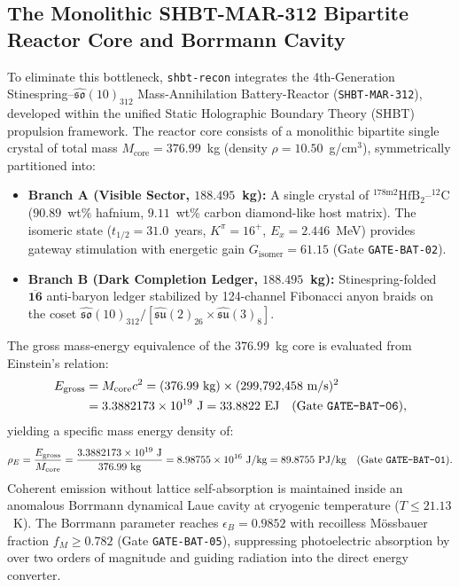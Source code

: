 \documentclass[11pt,onecolumn]{article}
\begin{document}
\FloatBarrier
\subsection{The Monolithic SHBT-MAR-312 Bipartite Reactor Core and Borrmann Cavity}
To eliminate this bottleneck, \texttt{shbt-recon} integrates the 4th-Generation Stinespring--$\widehat{\mathfrak{so}}(10)_{312}$ Mass-Annihilation Battery-Reactor (\texttt{SHBT-MAR-312}), developed within the unified Static Holographic Boundary Theory (SHBT) propulsion framework. The reactor core consists of a monolithic bipartite single crystal of total mass $M_{\text{core}} = 376.99$~kg (density $\rho = 10.50$~g/cm$^3$), symmetrically partitioned into:
\begin{itemize}
    \item \textbf{Branch A (Visible Sector, $188.495$~kg):} A single crystal of $^{178\text{m}2}\text{HfB}_2\text{--}^{12}\text{C}$ ($90.89$~wt\% hafnium, $9.11$~wt\% carbon diamond-like host matrix). The isomeric state ($t_{1/2} = 31.0$~years, $K^\pi = 16^+$, $E_x = 2.446$~MeV) provides gateway stimulation with energetic gain $G_{\text{isomer}} = 61.15$ (Gate \texttt{GATE-BAT-02}).
    \item \textbf{Branch B (Dark Completion Ledger, $188.495$~kg):} Stinespring-folded $\overline{\mathbf{16}}$ anti-baryon ledger stabilized by 124-channel Fibonacci anyon braids on the coset $\widehat{\mathfrak{so}}(10)_{312} / [\widehat{\mathfrak{su}}(2)_{26} \times \widehat{\mathfrak{su}}(3)_8]$.
\end{itemize}
The gross mass-energy equivalence of the $376.99$~kg core is evaluated from Einstein's relation:
\begin{equation}
\begin{split}
E_{\text{gross}} &= M_{\text{core}} c^2 = (376.99~\text{kg})\times (299{,}792{,}458~\text{m/s})^2 \\
&= 3.3882173\times 10^{19}~\text{J} = 33.8822~\text{EJ} \quad (\text{Gate \texttt{GATE-BAT-06}}),
\end{split}
\end{equation}
yielding a specific mass energy density of:
\begin{equation}
\rho_E = \frac{E_{\text{gross}}}{M_{\text{core}}} = \frac{3.3882173\times 10^{19}~\text{J}}{376.99~\text{kg}} = 8.98755\times 10^{16}~\text{J/kg} = 89.8755~\text{PJ/kg} \quad (\text{Gate \texttt{GATE-BAT-01}}).
\end{equation}
Coherent emission without lattice self-absorption is maintained inside an anomalous Borrmann dynamical Laue cavity at cryogenic temperature ($T \le 21.13$~K). The Borrmann parameter reaches $\epsilon_B = 0.9852$ with recoilless Mössbauer fraction $f_M \ge 0.782$ (Gate \texttt{GATE-BAT-05}), suppressing photoelectric absorption by over two orders of magnitude and guiding radiation into the direct energy converter.
\end{document}
